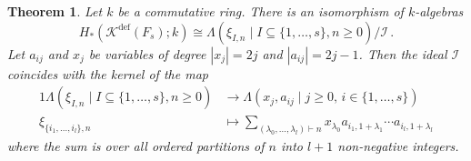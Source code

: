 \documentclass[oneside, a4paper, 12pt]{article}
\numberwithin{equation}{section}
\newcommand{\Kdef}{\mathcal{K}^{\mathrm{def}}}
\theoremstyle{plain}
\newtheorem{theorem}{Theorem}[section]
\theoremstyle{definition}
\theoremstyle{remark}
\begin{document}
\begin{theorem} \label{thm:quotientoffreealgebra}
Let $k$ be a commutative ring. There is an isomorphism of $k$-algebras
\[
H_\ast(\Kdef(F_s);k) \cong \Lambda(\xi_{I,n} \mid I\subseteq \{1,\dots,s\}, n\geq 0) /\mathscr{I}\, .
\]
Let $a_{ij}$ and $x_j$ be variables of degree $|x_j|=2j$ and $|a_{ij}|=2j-1$. Then the ideal $\mathscr{I}$ coincides with the kernel of the map
\begin{alignat*}{1}
\Lambda(\xi_{I,n} \mid I\subseteq \{1,\dots,s\},n\geq 0) & \to \Lambda(x_j,a_{ij} \mid j\geq 0,\, i\in \{1,\dots,s\}) \\
\xi_{\{i_1,\dots,i_l\},n} & \mapsto  \sum_{(\lambda_0,\dots,\lambda_l)\vdash n} x_{\lambda_0} a_{i_1,1+\lambda_1} \cdots a_{i_l,1+\lambda_l}
\end{alignat*}
where the sum is over all ordered partitions of $n$ into $l+1$ non-negative integers.
\end{theorem}
\end{document}
